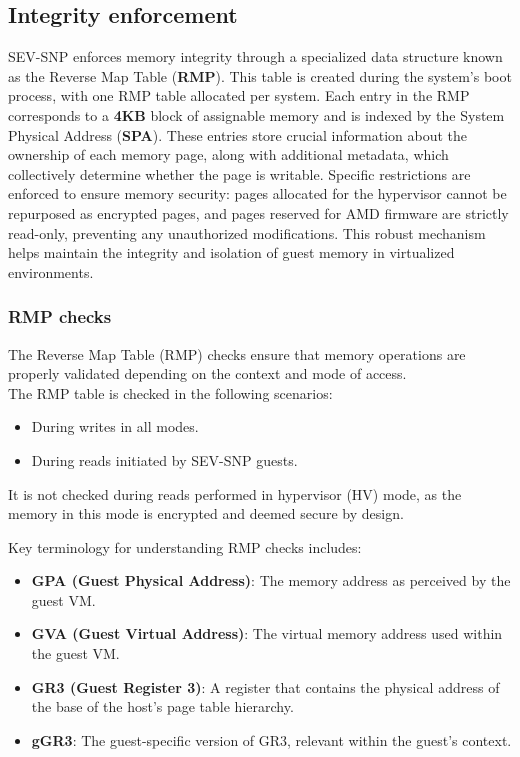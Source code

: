 \subsection{ Integrity enforcement}

SEV-SNP enforces memory integrity through a specialized data structure known as the Reverse Map Table (\textbf{RMP}). 
This table is created during the system's boot process, with one RMP table allocated per system. Each entry in the RMP corresponds to a \textbf{4KB} block of assignable memory and is indexed by the System Physical Address (\textbf{SPA}).
These entries store crucial information about the ownership of each memory page, along with additional metadata, which collectively determine whether the page is writable. 
Specific restrictions are enforced to ensure memory security: pages allocated for the hypervisor cannot be repurposed as encrypted pages, and pages reserved for AMD firmware are strictly read-only, preventing any unauthorized modifications. 
This robust mechanism helps maintain the integrity and isolation of guest memory in virtualized environments.

\subsubsection{RMP checks}
The Reverse Map Table (RMP) checks ensure that memory operations are properly validated depending on the context and mode of access. \\
The RMP table is checked in the following scenarios: 
    \begin{itemize} 
        \item During writes in all modes. 
        \item During reads initiated by SEV-SNP guests. 
    \end{itemize} 
It is not checked during reads performed in hypervisor (HV) mode, as the memory in this mode is encrypted and deemed secure by design. 


Key terminology for understanding RMP checks includes: 
\begin{itemize} 
    \item \textbf{GPA (Guest Physical Address)}: The memory address as perceived by the guest VM. 
    \item \textbf{GVA (Guest Virtual Address)}: The virtual memory address used within the guest VM. 
    \item \textbf{GR3 (Guest Register 3)}: A register that contains the physical address of the base of the host's page table hierarchy.
    \item \textbf{gGR3}: The guest-specific version of GR3, relevant within the guest's context. 
\end{itemize}

